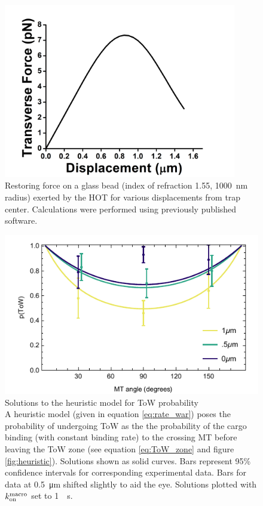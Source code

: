 \begin{figure}
\centering
\includegraphics[width=4in]{appendix1/FvsL}
\caption[Restoring force on Bead Handles]{Restoring force on a glass bead (index of refraction 1.55, \SI{1000}{\nano\meter} radius) exerted by the HOT for various displacements from trap center. Calculations were performed using previously published software\cite{Nahmias2002}.}
\label{fig:BHforce}
\end{figure}

\clearpage

\begin{figure}
\centering
\includegraphics[width=12cm]{appendix1/heuristicEXP.pdf}
\caption[Solutions to the heuristic model for ToW probability]{Solutions to the heuristic model for ToW probability \\
A heuristic model (given in equation \ref{eq:rate_war}) poses the probability of undergoing ToW as the the probability of the cargo binding (with constant binding rate) to the crossing MT before leaving the ToW zone (see equation \ref{eq:ToW_zone} and figure \ref{fig:heuristic}). 
Solutions shown as solid curves. Bars represent 95\% confidence intervals for corresponding experimental data. Bars for data at \SI{.5}{\micro\meter} shifted slightly to aid the eye. Solutions plotted with $k_\text{on}^\text{macro}$ set to \SI{1}{\per\second}.
} \label{fig:heuristicEXP}
\end{figure}

